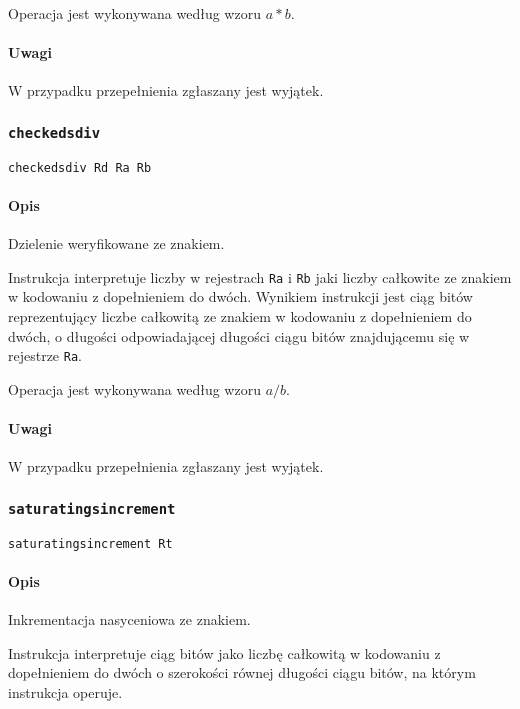 Operacja jest wykonywana według wzoru $a * b$.

\paragraph*{Uwagi}

W przypadku przepełnienia zgłaszany jest wyjątek.

\subsubsection{\texttt{checkedsdiv}}

\begin{lstlisting}
checkedsdiv Rd Ra Rb
\end{lstlisting}

\paragraph*{Opis} Dzielenie weryfikowane ze znakiem.

Instrukcja interpretuje liczby w rejestrach \texttt{Ra} i \texttt{Rb} jaki
liczby całkowite ze znakiem w kodowaniu z dopełnieniem do dwóch. Wynikiem
instrukcji jest ciąg bitów reprezentujący liczbe całkowitą ze znakiem w
kodowaniu z dopełnieniem do dwóch, o długości odpowiadającej długości ciągu
bitów znajdującemu się w rejestrze \texttt{Ra}.

Operacja jest wykonywana według wzoru $a / b$.

\paragraph*{Uwagi}

W przypadku przepełnienia zgłaszany jest wyjątek.

\subsubsection{\texttt{saturatingsincrement}}

\begin{lstlisting}
saturatingsincrement Rt
\end{lstlisting}

\paragraph*{Opis} Inkrementacja nasyceniowa ze znakiem.

Instrukcja interpretuje ciąg bitów jako liczbę całkowitą w kodowaniu z
dopełnieniem do dwóch o szerokości równej długości ciągu bitów, na którym
instrukcja operuje.

